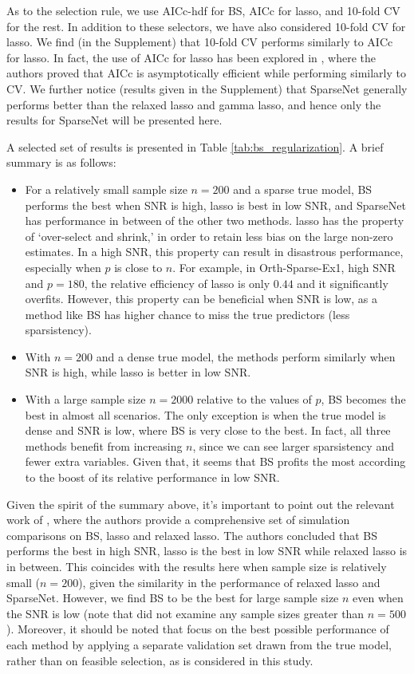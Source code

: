 As to the selection rule, we use AICc-hdf for BS, AICc for lasso, and 10-fold CV for the rest. In addition to these selectors, we have also considered 10-fold CV for lasso. We find (in the Supplement) that 10-fold CV performs similarly to AICc for lasso. In fact, the use of AICc for lasso has been explored in \citet{Flynn2013}, where the authors proved that AICc is asymptotically efficient while performing similarly to CV. We further notice (results given in the Supplement) that SparseNet generally performs better than the relaxed lasso and gamma lasso, and hence only the results for SparseNet will be presented here. 

A selected set of results is presented in Table \ref{tab:bs_regularization}. A brief summary is as follows:
\begin{itemize}
	\item For a relatively small sample size $n=200$ and a sparse true model, BS performs the best when SNR is high,  lasso is best in low SNR, and SparseNet has performance in between of the other two methods. lasso has the property of `over-select and shrink,' in order to retain less bias on the large non-zero estimates. In a high SNR, this property can result in disastrous performance, especially when $p$ is close to $n$. For example, in Orth-Sparse-Ex1, high SNR and $p=180$, the relative efficiency of lasso is only $0.44$ and it significantly overfits. However, this property can be beneficial when SNR is low, as a method like BS has higher chance to miss the true predictors (less sparsistency).
	
	\item With $n=200$ and a dense true model, the methods perform similarly when SNR is high, while lasso is better in low SNR.
	
	\item With a large sample size $n=2000$ relative to the values of $p$, BS becomes the best in almost all scenarios. The only exception is when the true model is dense and SNR is low, where BS is very close to the best. In fact, all three methods benefit from increasing $n$, since we can see larger sparsistency and fewer extra variables. Given that, it seems that BS profits the most according to the boost of its relative performance in low SNR. 
\end{itemize}

Given the spirit of the summary above, it's important to point out the relevant work of \citet{Hastie2017}, where the authors provide a comprehensive set of simulation comparisons on BS, lasso and relaxed lasso. The authors concluded that BS performs the best in high SNR, lasso is the best in low SNR while relaxed lasso is in between. This coincides with the results here when sample size is relatively small ($n=200$), given the similarity in the performance of relaxed lasso and SparseNet. However, we find BS to be the best for large sample size $n$ even when the SNR is low (note that \citet{Hastie2017} did not examine any sample sizes greater than $n=500$). Moreover, it should be noted that \citet{Hastie2017} focus on the best possible performance of each method by applying a separate validation set drawn from the true model, rather than on feasible selection, as is considered in this study. 

